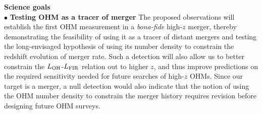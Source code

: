\documentclass[letterpaper,11pt]{article}
\newcommand{\LFIR}{\mbox{$L_{\rm FIR}$}\xspace}
\newcommand{\LOH}{$L_{\rm OH}$\xspace}
\newcommand{\obs}{observations\xspace}
\begin{document}
\noindent \textbf{Science goals}
\vspace{.2em}\\
$\bullet$ {\bf Testing OHM as a tracer of merger}
The proposed \obs will establish the first OHM measurement in a {\it bona-fide} high-$z$ merger, thereby
demonstrating the feasibility of using it as a tracer of distant mergers and 
testing the long-envisaged hypothesis of using its number density to constrain 
the redshift evolution of merger rate. 
Such a detection will also allow us to better constrain the
\LOH-\LFIR relation out to higher $z$, %
and thus improve predictions on the required sensitivity needed for future searches of high-$z$ OHMs.
Since our target is a merger, 
a null detection would also indicate that the notion of 
using the OHM number density to constrain the merger history requires revision before designing future OHM surveys.
\end{document}
